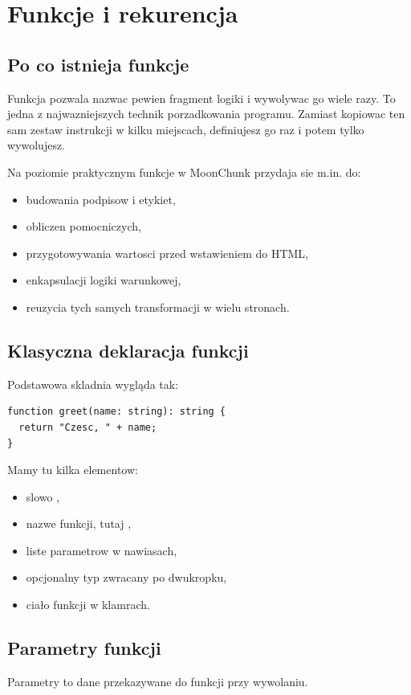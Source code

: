 \chapter{Funkcje i rekurencja}

\section{Po co istnieja funkcje}
Funkcja pozwala nazwac pewien fragment logiki i wywolywac go wiele razy. To jedna z
najwazniejszych technik porzadkowania programu. Zamiast kopiowac ten sam zestaw
instrukcji w kilku miejscach, definiujesz go raz i potem tylko wywolujesz.

Na poziomie praktycznym funkcje w MoonChunk przydaja sie m.in. do:

\begin{itemize}
  \item budowania podpisow i etykiet,
  \item obliczen pomocniczych,
  \item przygotowywania wartosci przed wstawieniem do HTML,
  \item enkapsulacji logiki warunkowej,
  \item reuzycia tych samych transformacji w wielu stronach.
\end{itemize}

\section{Klasyczna deklaracja funkcji}
Podstawowa skladnia wygląda tak:

\begin{lstlisting}[style=moonchunk,caption={Klasyczna funkcja w MoonChunk}]
function greet(name: string): string {
  return "Czesc, " + name;
}
\end{lstlisting}

Mamy tu kilka elementow:

\begin{itemize}
  \item slowo ,
  \item nazwe funkcji, tutaj ,
  \item liste parametrow w nawiasach,
  \item opcjonalny typ zwracany po dwukropku,
  \item ciało funkcji w klamrach.
\end{itemize}

\section{Parametry funkcji}
Parametry to dane przekazywane do funkcji przy wywolaniu.

